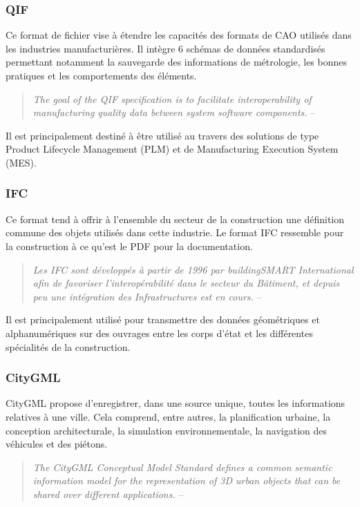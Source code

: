\documentclass[a4paper,12pt]{article}
\begin{document}
\subsubsection*{QIF}
\label{sec:org7ed9f0d}
Ce format de fichier vise à étendre les capacités des formats de CAO utilisés dans les industries manufacturières. Il intègre 6 schémas de données standardisés permettant notamment la sauvegarde des informations de métrologie, les bonnes pratiques et les comportements des éléments.
\begin{quote}
\emph{The goal of the QIF specification is to facilitate interoperability of manufacturing quality data between system software components.} -- \cite{QualityInformationFramework2018}
\end{quote}

Il est principalement destiné à être utilisé au travers des solutions de type Product Lifecycle Management (PLM) et de Manufacturing Execution System (MES).
\subsubsection*{IFC}
\label{sec:org63bad96}
Ce format tend à offrir à l'ensemble du secteur de la construction une définition commune des objets utilisés dans cette industrie. Le format IFC ressemble pour la construction à ce qu'est le PDF pour la documentation.\cite{ffbatimentQuestceQuun}
\begin{quote}
\emph{Les IFC sont développés à partir de 1996 par buildingSMART International afin de favoriser l’interopérabilité dans le secteur du Bâtiment, et depuis peu une intégration des Infrastructures est en cours.} -- \cite{picinbonoIFCPratique2018}
\end{quote}

Il est principalement utilisé pour transmettre des données géométriques et alphanumériques sur des ouvrages entre les corps d'état et les différentes spécialités de la construction.
\subsubsection*{CityGML}
\label{sec:orgd5debb8}
CityGML propose d'enregistrer, dans une source unique, toutes les informations relatives à une ville. Cela comprend, entre autres, la planification urbaine, la conception architecturale, la simulation environnementale, la navigation des véhicules et des piétons.
\begin{quote}
\emph{The CityGML Conceptual Model Standard defines a common semantic information model for the representation of 3D urban objects that can be shared over different applications.} -- \cite{kolbeOGCCityGeography2021}
\end{quote}
\end{document}
